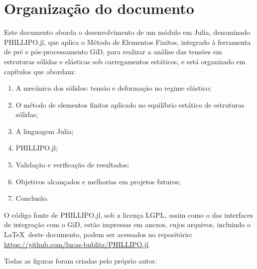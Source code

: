 \section{Organização do documento}

Este documento aborda o desenvolvimento de um módulo em Julia, denominado PHILLIPO.jl, que aplica o Método de Elementos Finitos, integrado à ferramenta de pré e pós-processamento GiD, para realizar a análise das tensões em estruturas sólidas e elásticas sob carregamentos estáticos, e está organizado em capítulos que abordam:

\begin{enumerate}
    \item A mecânica dos sólidos: tensão e deformação no regime elástico;
    \item O método de elementos finitos aplicado no equilíbrio estático de estruturas sólidas;
    \item A linguagem Julia;
    \item PHILLIPO.jl;
    \item Validação e verificação de resultados;
    \item Objetivos alcançados e melhorias em projetos futuros;
    \item Conclusão.
\end{enumerate}

O código fonte de PHILLIPO.jl, sob a licença LGPL, assim como o das interfaces de integração com o GiD, estão impressas em anexos, cujos arquivos, incluindo o \LaTeX\ deste documento, podem ser acessados no repositório: \url{https://github.com/lucas-bublitz/PHILLIPO.jl}.

Todas as figuras foram criadas pelo próprio autor.
